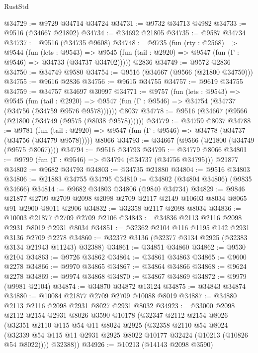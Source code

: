 \begin{lexlean}{RustStd}
\begin{coremodule}
@34729 := @9729 @34714 @34724
@34731 := @9732 @34713 @4982
@34733 := @9516 (@34667 @21802)
@34734 := @34692 @21805
@34735 := @9587 @34734
@34737 := @9516 (@34735 @9608)
@34748 := @9735
    (fun (rty : @2568) =>
    @9544
      (fun (lets : @9543) =>
      @9545 (fun (tail : @2920) => @9547 (fun (Γ : @9546) => @34733 (@34737 @34702)))))
    @2836
@34749 := @9572 @2836
@34750 := @34749 @9580
@34754 := @9516 (@34667 (@9566 (@21800 @34750)))
@34755 := @9616 @2836
@34756 := @9615 @34755
@34757 := @9619 @34755
@34759 := @34757 @34697 @30997
@34771 := @9757
    (fun (lets : @9543) =>
    @9545
      (fun (tail : @2920) =>
      @9547 (fun (Γ : @9546) => @34754 (@34737 (@34756 (@34759 @9576 @9578))))))
    @8037
@34778 := @9516 (@34667 (@9566 (@21800 (@34749 (@9575 (@8038 @9578))))))
@34779 := @34759 @8037
@34788 := @9781
    (fun (tail : @2920) => @9547 (fun (Γ : @9546) => @34778 (@34737 (@34756 (@34779 @9578)))))
    @8066
@34793 := @34667 (@9566 (@21800 (@34749 (@9575 @8067))))
@34794 := @9516 @34793
@34795 := @34779 @8066
@34801 := @9799 (fun (Γ : @9546) => @34794 (@34737 (@34756 @34795))) @21877
@34802 := @9682 @34793
@34803 := @34735 @21880
@34804 := @9516 @34803
@34806 := @21883 @34755 @34795
@34810 := @34802 (@34804 @34806) (@9835 @34666)
@34814 := @9682 @34803 @34806 (@9840 @34734)
@34829 := @9846
    @21877
    @2709
    @2709
    @2098
    @2098
    @2709
    @2117
    @2149
    @10603
    @8034
    @8065
    @91
    @2900
    @8011
    @2906
@34832 := @32358 @2117 @2098 @8034
@34836 := @10003 @21877 @2709 @2709 @2106
@34843 := @34836 @2113 @2116 @2098 @2931 @8019 @2931 @8034
@34851 := @32362 @2104 @116 @1195 @142 @2931 @3136 @2709 @2278
@34860 := @32372 @3136 (@32377 @3134 @2925 (@32383 @3134 @21943 @11243) @32388)
@34861 := @34851 @34860
@34862 := @9530 @2104
@34863 := @9726 @34862
@34864 := @34861 @34863
@34865 := @9600 @2278
@34866 := @9970 @34865
@34867 := @34864 @34866
@34868 := @9624 @2278
@34869 := @9974 @34868
@34870 := @34867 @34869
@34872 := @9979 (@9981 @2104)
@34874 := @34870 @34872 @13124
@34875 := @34843 @34874
@34880 := @10084 @21877 @2709 @2709 @10088 @8019
@34887 := @34880 @2113 @2116 @2098 @2931 @8027 @2931 @8032
@34923 := @33000
    @2098
    @2112
    @2154
    @2931
    @8026
    @3590
    @10178
    (@32347
      @2112
      @2154
      @8026
      (@32351
        @2110
        @115
        @54
        @11
        @8024
        @2925
        (@32358
          @2110
          @54
          @8024
          (@32339 @54 @115 @11 @2931 @2925 @8022 @10177 @32424 (@10213 (@10826 @54 @8022))))
        @32388))
@34926 := @10213 (@14143 @2098 @3590)

\end{coremodule}
\end{lexlean}
